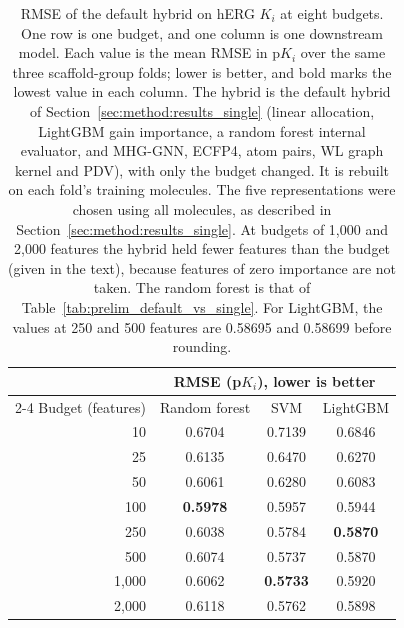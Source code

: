 \begin{table}[htbp]
\centering
\small
\begin{tabular}{@{}rccc@{}}
\toprule
 & \multicolumn{3}{c}{RMSE (p$K_i$), lower is better} \\
\cmidrule(l){2-4}
Budget (features) & Random forest & SVM & LightGBM \\
\midrule
10 & 0.6704 & 0.7139 & 0.6846 \\
25 & 0.6135 & 0.6470 & 0.6270 \\
50 & 0.6061 & 0.6280 & 0.6083 \\
100 & \textbf{0.5978} & 0.5957 & 0.5944 \\
250 & 0.6038 & 0.5784 & \textbf{0.5870} \\
500 & 0.6074 & 0.5737 & 0.5870 \\
1,000 & 0.6062 & \textbf{0.5733} & 0.5920 \\
2,000 & 0.6118 & 0.5762 & 0.5898 \\
\bottomrule
\end{tabular}
\caption[RMSE of the default hybrid against budget on hERG $K_i$.]{RMSE of the default hybrid on hERG $K_i$ at eight budgets. One row is one budget, and one column is one downstream model. Each value is the mean RMSE in p$K_i$ over the same three scaffold-group folds; lower is better, and bold marks the lowest value in each column. The hybrid is the default hybrid of Section~\ref{sec:method:results_single} (linear allocation, LightGBM gain importance, a random forest internal evaluator, and MHG-GNN, ECFP4, atom pairs, WL graph kernel and PDV), with only the budget changed. It is rebuilt on each fold's training molecules. The five representations were chosen using all molecules, as described in Section~\ref{sec:method:results_single}. At budgets of 1,000 and 2,000 features the hybrid held fewer features than the budget (given in the text), because features of zero importance are not taken. The random forest is that of Table~\ref{tab:prelim_default_vs_single}. For LightGBM, the values at 250 and 500 features are 0.58695 and 0.58699 before rounding.}
\label{tab:prelim_budget}
\end{table}


